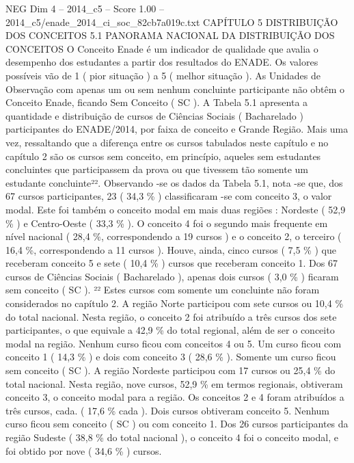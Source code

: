 \begin{textsample}{NEG Dim 4 – 2014\_c5 – Score 1.00 – 2014\_c5/enade\_2014\_ci\_soc\_82cb7a019c.txt}  \label{ex:f4_neg_202}
CAPÍTULO 5 DISTRIBUIÇÃO DOS CONCEITOS 5.1 PANORAMA NACIONAL DA DISTRIBUIÇÃO DOS CONCEITOS O Conceito Enade é um indicador de qualidade que avalia o desempenho dos estudantes a partir dos resultados do ENADE.
Os valores possíveis vão de 1 ( pior situação ) a 5 ( melhor situação ).
As Unidades de Observação com apenas um ou sem nenhum concluinte participante não obtêm o Conceito Enade, ficando Sem Conceito ( SC ).
A Tabela 5.1 apresenta a quantidade e distribuição de cursos de Ciências Sociais ( Bacharelado ) participantes do ENADE/2014, por faixa de conceito e Grande Região.
Mais uma vez, ressaltando que a diferença entre os cursos tabulados neste capítulo e no capítulo 2 são os cursos sem conceito, em princípio, aqueles sem estudantes concluintes que participassem da prova ou que tivessem tão somente um estudante concluinte²².
Observando -se os dados da Tabela 5.1, nota -se que, dos 67 cursos participantes, 23 ( 34,3 \% ) classificaram -se com conceito 3, o valor modal.
Este foi também o conceito modal em mais duas regiões : Nordeste ( 52,9 \% ) e Centro-Oeste ( 33,3 \% ).
O conceito 4 foi o segundo mais frequente em nível nacional ( 28,4 \%, correspondendo a 19 cursos ) e o conceito 2, o terceiro ( 16,4 \%, correspondendo a 11 cursos ).
Houve, ainda, cinco cursos ( 7,5 \% ) que receberam conceito 5 e sete ( 10,4 \% ) cursos que receberam conceito 1.
Dos 67 cursos de Ciências Sociais ( Bacharelado ), apenas dois cursos ( 3,0 \% ) ficaram sem conceito ( SC ). ²² Estes cursos com somente um concluinte não foram considerados no capítulo 2.
A região Norte participou com sete cursos ou 10,4 \% do total nacional.
Nesta região, o conceito 2 foi atribuído a três cursos dos sete participantes, o que equivale a 42,9 \% do total regional, além de ser o conceito modal na região.
Nenhum curso ficou com conceitos 4 ou 5.
Um curso ficou com conceito 1 ( 14,3 \% ) e dois com conceito 3 ( 28,6 \% ).
Somente um curso ficou sem conceito ( SC ).
A região Nordeste participou com 17 cursos ou 25,4 \% do total nacional.
Nesta região, nove cursos, 52,9 \% em termos regionais, obtiveram conceito 3, o conceito modal para a região.
Os conceitos 2 e 4 foram atribuídos a três cursos, cada. ( 17,6 \% cada ).
Dois cursos obtiveram conceito 5.
Nenhum curso ficou sem conceito ( SC ) ou com conceito 1.
Dos 26 cursos participantes da região Sudeste ( 38,8 \% do total nacional ), o conceito 4 foi o conceito modal, e foi obtido por nove ( 34,6 \% ) cursos.

\end{textsample}
